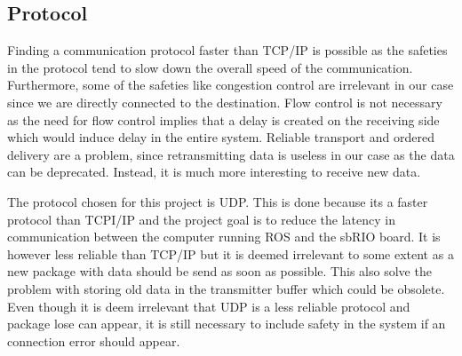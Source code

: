 \subsection{Protocol}\label{sec:Protocol}

Finding a communication protocol faster than TCP/IP is possible as the safeties in the protocol tend to slow down the overall speed of the communication. Furthermore, some of the safeties like congestion control are irrelevant in our case since we are directly connected to the destination. Flow control is not necessary as the need for flow control implies that a delay is created on the receiving side which would induce delay in the entire system. Reliable transport and ordered delivery are a problem, since retransmitting data is useless in our case as the data can be deprecated. Instead, it is much more interesting to receive new data. 

The protocol chosen for this project is \gls{UDP}. This is done because its a faster protocol than TCPI/IP and the project goal is to reduce the latency in communication between the computer running ROS and the sbRIO board. It is however less reliable than TCP/IP but it is deemed irrelevant to some extent as a new package with data should be send as soon as possible. This also solve the problem with storing old data in the transmitter buffer which could be obsolete. Even though it is deem irrelevant that \gls{UDP} is a less reliable protocol and package lose can appear, it is still necessary to include safety in the system if an connection error should appear.  





